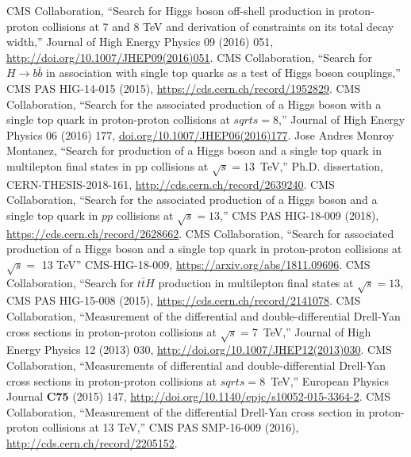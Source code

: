 \begin{thebibliography}{99}
%
    CMS Collaboration, ``Search for Higgs boson off-shell production in proton-proton collisions at 7 and 8 TeV and derivation of constraints on its total decay width,'' Journal of High Energy Physics 09 (2016) 051, \url{http://doi.org/10.1007/JHEP09(2016)051}.
%
%
 CMS Collaboration, ``Search for $H \to b\bar{b}$ in
  association with single top quarks as a test of Higgs boson couplings,'' CMS PAS HIG-14-015 (2015), \url{https://cds.cern.ch/record/1952829}.
%
 CMS Collaboration, ``Search for the associated
  production of a Higgs boson with a single top quark in proton-proton
  collisions at $sqrt{s} = 8$\TeV,'' Journal of High Energy Physics 06 (2016) 177, \url{doi.org/10.1007/JHEP06(2016)177}.
%
 Jose Andres Monroy Montanez, ``Search for production of a Higgs boson and a single top quark in multilepton final states in pp collisions at $\sqrt{s} = 13$~TeV,'' Ph.D. dissertation, CERN-THESIS-2018-161, \url{http://cds.cern.ch/record/2639240}.
%
 CMS Collaboration, ``Search for the associated
    production of a Higgs boson and a single top quark in $pp$ collisions
    at $\sqrt{s} = 13$\TeV,'' CMS PAS HIG-18-009 (2018),
    \url{https://cds.cern.ch/record/2628662}.
%
 CMS Collaboration, ``Search for associated production of a Higgs boson and a single top quark
 in proton-proton collisions at $\sqrt{s} =$ 13 TeV'' CMS-HIG-18-009, \url{https://arxiv.org/abs/1811.09696}.
%
 CMS Collaboration, ``Search for $t\bar{t}H$
  production in multilepton final states at $\sqrt{s} = 13$\TeV, CMS PAS
  HIG-15-008 (2015), \url{https://cds.cern.ch/record/2141078}.
%
%
    CMS Collaboration, ``Measurement of the differential and double-differential Drell-Yan cross sections in proton-proton collisions at $\sqrt{s}=$7~TeV,''
    Journal of High Energy Physics 12 (2013) 030, \url{http://doi.org/10.1007/JHEP12(2013)030}.
%
    CMS Collaboration, ``Measurements of differential and double-differential Drell-Yan cross sections in proton-proton collisions at $sqrt{s}=$8~TeV,''
    European Physics Journal {\bf C75} (2015) 147, \url{http://doi.org/10.1140/epjc/s10052-015-3364-2}.
%
    CMS Collaboration, ``Measurement of the differential Drell-Yan cross section in proton-proton collisions at 13 TeV,'' 
    CMS PAS SMP-16-009 (2016), \url{http://cds.cern.ch/record/2205152}.

\end{thebibliography}
